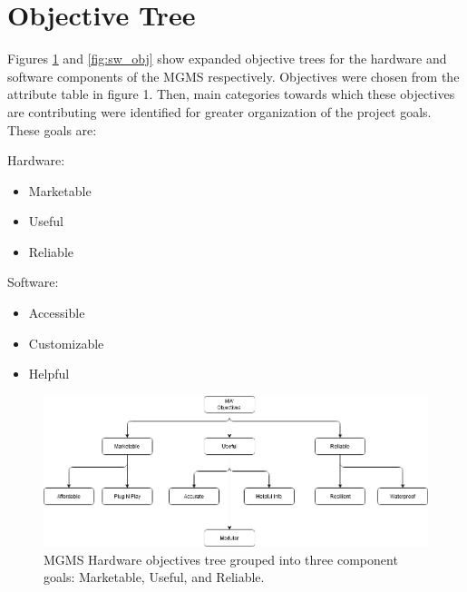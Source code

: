 \documentclass{report}
\begin{document}
\section{Objective Tree}

Figures \ref{fig:hw_obj} and \ref{fig:sw_obj} show expanded objective trees for the hardware and software components of the MGMS respectively. Objectives were chosen from the attribute table in figure 1. Then, main categories towards which these objectives are contributing were identified for greater organization of the project goals. These goals are:

\begin{multicols}{2}
    Hardware:
    \begin{itemize}
        \item
              Marketable
        \item
              Useful
        \item
              Reliable
    \end{itemize}
    Software:
    \begin{itemize}
        \item
              Accessible
        \item
              Customizable
        \item
              Helpful
    \end{itemize}
\end{multicols}


\begin{figure}[H]
    \centering
    \includegraphics[width=\linewidth]{PNGs/HW_Objective_Tree.PNG}
    \caption{MGMS Hardware objectives tree grouped into three component goals: Marketable, Useful, and Reliable.}
    \label{fig:hw_obj}
\end{figure}
\end{document}
